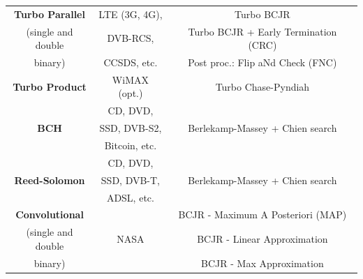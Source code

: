 \documentclass[11pt]{report}
\begin{document}
\begin{table}[htp]
{\begin{tabular}{| c | c | c |}
      \hline
      \multirow{1}{*}{\textbf{Turbo Parallel}} & LTE (3G, 4G),                       & Turbo BCJR                             \\
      (single and double                       & DVB-RCS,                            & Turbo BCJR + Early Termination (CRC)   \\
      binary)                                  & CCSDS, etc.                         & Post proc.: Flip aNd Check (FNC)       \\
      \hline
      \multirow{2}{*}{\textbf{Turbo Product}}  & \multirow{2}{*}{WiMAX (opt.)}       & \multirow{2}{*}{Turbo Chase-Pyndiah}   \\
                                               &                                     &                                        \\
      \hline
      \multirow{3}{*}{\textbf{BCH}}            & CD, DVD,                            &                                        \\
                                               & SSD, DVB-S2,                        & Berlekamp-Massey + Chien search        \\
                                               & Bitcoin, etc.                       &                                        \\
      \hline
      \multirow{3}{*}{\textbf{Reed-Solomon}}   & CD, DVD,                            &                                        \\
                                               & SSD, DVB-T,                         & Berlekamp-Massey + Chien search        \\
                                               & ADSL, etc.                          &                                        \\
      \hline
      \multirow{1}{*}{\textbf{Convolutional}}  &                                     & BCJR - Maximum A Posteriori (MAP)      \\
      (single and double                       & NASA                                & BCJR - Linear Approximation            \\
      binary)                                  &                                     & BCJR - Max Approximation               \\
      \hline
    \end{tabular}
  }%
\end{table}
\end{document}
